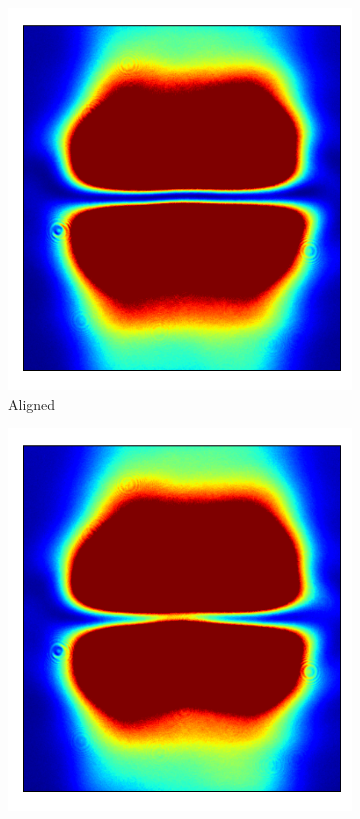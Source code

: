 \begin{figure}
\begin{subfigure}{0.3\textwidth}
        \includegraphics[width=\textwidth]{chapters/chapter_3/figures/align3.pdf}
        \caption{Aligned}
    \end{subfigure}
    \hfill
    \begin{subfigure}{0.3\textwidth}
        \includegraphics[width=\textwidth]{chapters/chapter_3/figures/align2.pdf}

\end{subfigure}
\end{figure}
